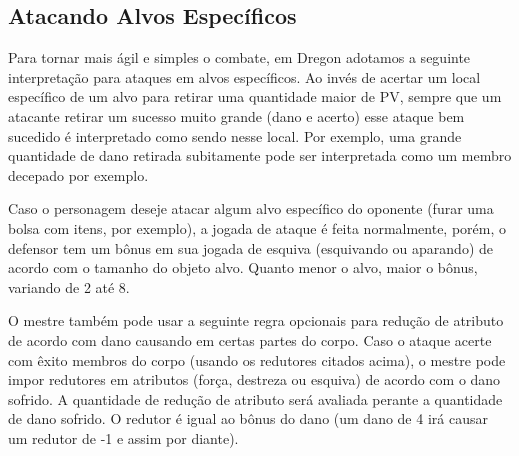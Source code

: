 


\subsection{Atacando Alvos Específicos}

Para tornar mais ágil e simples o combate, em Dregon adotamos a seguinte interpretação para ataques em alvos específicos. Ao invés de acertar um local específico de um alvo para retirar uma quantidade maior de PV, sempre que um atacante retirar um sucesso muito grande (dano e acerto) esse ataque bem sucedido é interpretado como sendo nesse local. Por exemplo, uma grande quantidade de dano retirada subitamente pode ser interpretada como um membro decepado por exemplo.

Caso o personagem deseje atacar algum alvo específico do oponente (furar uma bolsa com itens, por exemplo), a jogada de ataque é feita normalmente, porém, o defensor tem um bônus em sua jogada de esquiva (esquivando ou aparando) de acordo com o tamanho do objeto alvo. Quanto menor o alvo, maior o bônus, variando de 2 até 8.

O mestre também pode usar a seguinte regra opcionais para redução de atributo de acordo com dano causando em certas partes do corpo. Caso o ataque acerte com êxito membros do corpo (usando os redutores citados acima), o mestre pode impor redutores em atributos (força, destreza ou esquiva) de acordo com o dano sofrido. A quantidade de redução de atributo será avaliada perante a quantidade de dano sofrido. O redutor é igual ao bônus do dano (um dano de 4 irá causar um redutor de -1 e assim por diante).
  

